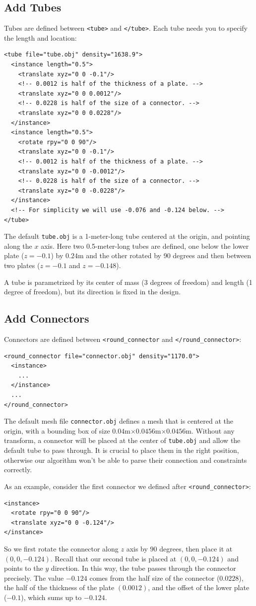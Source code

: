 \subsection{Add Tubes}
Tubes are defined between \texttt{<tube>} and \texttt{</tube>}. Each tube needs you to specify the length and location:
\begin{verbatim}
<tube file="tube.obj" density="1638.9">
  <instance length="0.5">
    <translate xyz="0 0 -0.1"/>
    <!-- 0.0012 is half of the thickness of a plate. -->
    <translate xyz="0 0 0.0012"/>
    <!-- 0.0228 is half of the size of a connector. -->
    <translate xyz="0 0 0.0228"/>
  </instance>
  <instance length="0.5">
    <rotate rpy="0 0 90"/>
    <translate xyz="0 0 -0.1"/>
    <!-- 0.0012 is half of the thickness of a plate. -->
    <translate xyz="0 0 -0.0012"/>
    <!-- 0.0228 is half of the size of a connector. -->
    <translate xyz="0 0 -0.0228"/>
  </instance>
  <!-- For simplicity we will use -0.076 and -0.124 below. -->
</tube>
\end{verbatim}
The default \texttt{tube.obj} is a 1-meter-long tube centered at the origin, and pointing along the $x$ axis. Here two 0.5-meter-long tubes are defined, one below the lower plate ($z=-0.1$) by $0.24$m and the other rotated by 90 degrees and then between two plates ($z=-0.1$ and $z=-0.148$).

A tube is parametrized by its center of mass (3 degrees of freedom) and length (1 degree of freedom), but its direction is fixed in the design.

\subsection{Add Connectors}
Connectors are defined between \texttt{<round\_connector} and \texttt{</round\_connector>}:
\begin{verbatim}
<round_connector file="connector.obj" density="1170.0">
  <instance>
    ...
  </instance>
  ...
</round_connector>
\end{verbatim}
The default mesh file \texttt{connector.obj} defines a mesh that is centered at the origin, with a bounding box of size $0.04$m$\times0.0456$m$\times0.0456$m. Without any transform, a connector will be placed at the center of \texttt{tube.obj} and allow the default tube to pass through. It is crucial to place them in the right position, otherwise our algorithm won't be able to parse their connection and constraints correctly.

As an example, consider the first connector we defined after \texttt{<round\_connector>}:
\begin{verbatim}
<instance>
  <rotate rpy="0 0 90"/>
  <translate xyz="0 0 -0.124"/>
</instance>
\end{verbatim}
So we first rotate the connector along $z$ axis by $90$ degrees, then place it at $(0,0,-0.124)$. Recall that our second tube is placed at $(0,0,-0.124)$ and points to the $y$ direction. In this way, the tube passes through the connector precisely. The value $-0.124$ comes from the half size of the connector ($0.0228$), the half of the thickness of the plate $(0.0012)$, and the offset of the lower plate ($-0.1$), which sums up to $-0.124$.

